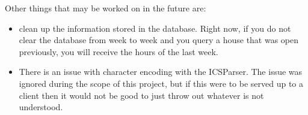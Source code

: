 \documentclass[letterpaper,11pt]{report}
\theoremstyle{definition}
\theoremstyle{definition}
\begin{document}
\hspace*{-2.5em} Other things that may be worked on in the future are:
\begin{itemize}
  \item clean up the information stored in the database. Right now, if you do not clear the database from week to week and you query a house that was open previously, you will receive the hours of the last week.
  \item There is an issue with character encoding with the ICSParser. The issue was ignored during the scope of this project, but if this were to be served up to a client then it would not be good to just throw out whatever is not understood.
\end{itemize}






\end{document}
